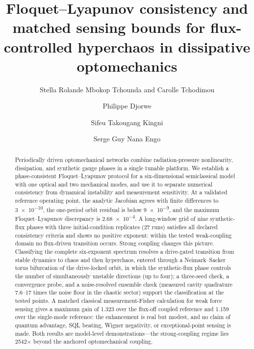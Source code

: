 \documentclass[aip,cha,reprint]{revtex4-2}
\begin{document}
\title{Floquet--Lyapunov consistency and matched sensing bounds for flux-controlled hyperchaos in dissipative optomechanics}
\author{Stella Rolande Mbokop Tchounda and Carolle Tchodimou}

\author{Philippe Djorwe}

\author{Sifeu Takougang Kingni}

\author{Serge Guy Nana Engo}

\begin{abstract}
Periodically driven optomechanical networks combine radiation-pressure
nonlinearity, dissipation, and synthetic gauge phases in a single tunable
platform. We establish a phase-consistent Floquet--Lyapunov protocol for a
six-dimensional semiclassical model with one optical and two mechanical modes,
and use it to separate numerical consistency from dynamical instability and
measurement sensitivity. At a validated reference operating point, the
analytic Jacobian agrees with finite differences to \num{3e-10}, the one-period
orbit residual is below \num{9e-9}, and the maximum Floquet--Lyapunov
discrepancy is \num{2.68e-4}. A long-window grid of nine synthetic-flux phases
with three initial-condition replicates (27 runs) satisfies all declared
consistency criteria and shows no positive exponent: within the tested
weak-coupling domain no flux-driven transition occurs. Strong coupling changes
this picture. Classifying the complete
six-exponent spectrum resolves a drive-gated transition
from stable dynamics to chaos and then hyperchaos, entered through a
Neimark--Sacker torus bifurcation of the drive-locked orbit, in which the
synthetic-flux phase controls the number of simultaneously unstable directions
(up to four);
a three-seed check, a convergence probe, and a
noise-resolved ensemble check (measured cavity quadrature \num{7.6}--\num{17}
times the noise floor in the chaotic sector) support the classification at the
tested points. A matched classical measurement-Fisher
calculation for weak force sensing gives a maximum gain of \num{1.323} over
the flux-off coupled reference and \num{1.159} over the single-mode reference:
the enhancement is real but modest, and no claim of quantum
advantage, SQL beating, Wigner negativity, or exceptional-point sensing is
made. Both results are model-level demonstrations---the strong-coupling regime
lies \num{2542}$\times$ beyond the anchored optomechanical coupling.
\end{abstract}
\end{document}

